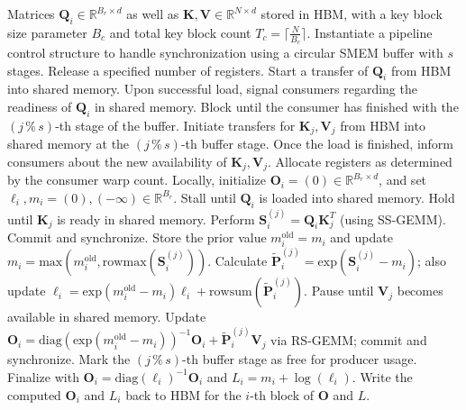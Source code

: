 \begin{enumerate}
\begin{algorithm}[H]
    \caption{\small\label{alg:flash3_wgmma_ws_only}\textsc{FlashAttention-3} forward propagation \textbf{excluding} intra-consumer overlapping -- CTA layout}
    \begin{algorithmic}[1]
\REQUIRE Matrices $\mathbf{Q}_i \in \mathbb{R}^{B_r \times d}$ as well as $\mathbf{K}, \mathbf{V} \in \mathbb{R}^{N \times d}$ stored in HBM, with a key block size parameter $B_c$ and total key block count $T_c = \lceil \frac{N}{B_c} \rceil$.
\STATE Instantiate a pipeline control structure to handle synchronization using a circular SMEM buffer with $s$ stages.
\STATE Release a specified number of registers.
\STATE Start a transfer of $\mathbf{Q}_i$ from HBM into shared memory.
\STATE Upon successful load, signal consumers regarding the readiness of $\mathbf{Q}_i$ in shared memory.
    \STATE Block until the consumer has finished with the $(j\,\%\,s)$-th stage of the buffer.
    \STATE Initiate transfers for $\mathbf{K}_j, \mathbf{V}_j$ from HBM into shared memory at the $(j\,\%\,s)$-th buffer stage.
    \STATE Once the load is finished, inform consumers about the new availability of $\mathbf{K}_j, \mathbf{V}_j$.
\ENDFOR
\ELSE 
\STATE Allocate registers as determined by the consumer warp count.
\STATE Locally, initialize $\mathbf{O}_i = (0) \in \mathbb{R}^{B_r \times d}$, and set $\ell_i, m_i = (0), (-\infty) \in \mathbb{R}^{B_r}$.
\STATE Stall until $\mathbf{Q}_i$ is loaded into shared memory.
\STATE Hold until $\mathbf{K}_j$ is ready in shared memory.
\STATE Perform $\mathbf{S}_i^{(j)} = \mathbf{Q}_i \mathbf{K}_j^T$ (using SS-GEMM). Commit and synchronize. \label{alg:ws_only_gemm1}
\STATE Store the prior value $m_i^{\mathrm{old}} = m_i$ and update $m_i = \mathrm{max}(m_i^{\mathrm{old}}, \mathrm{rowmax}(\mathbf{S}_i^{(j)}))$. \label{code-ws:softmax_start}
\STATE Calculate $\widetilde{\mathbf{P}}_i^{(j)} = \mathrm{exp}(\mathbf{S}_i^{(j)} - m_i)$; also update $\ell_i = \mathrm{exp}(m_i^{\mathrm{old}} - m_i) \ell_i + \mathrm{rowsum}(\widetilde{\mathbf{P}}_i^{(j)})$. \label{code-ws:softmax_end}
\STATE Pause until $\mathbf{V}_j$ becomes available in shared memory.
\STATE Update $\mathbf{O}_i = \mathrm{diag}(\mathrm{exp}(m_i^{\mathrm{old}} - m_i))^{-1} \mathbf{O}_i + \widetilde{\mathbf{P}}_i^{(j)} \mathbf{V}_j$ via RS-GEMM; commit and synchronize. \label{alg:ws_only_gemm2}
\STATE Mark the $(j\,\%\,s)$-th buffer stage as free for producer usage.
\ENDFOR
\STATE Finalize with $\mathbf{O}_i = \mathrm{diag}(\ell_i)^{-1} \mathbf{O}_i$ and $L_i = m_i + \log(\ell_i)$.
\STATE Write the computed $\mathbf{O}_i$ and $L_i$ back to HBM for the $i$-th block of $\mathbf{O}$ and $L$.
\ENDIF
\end{algorithmic}
\end{algorithm}


\end{enumerate}
